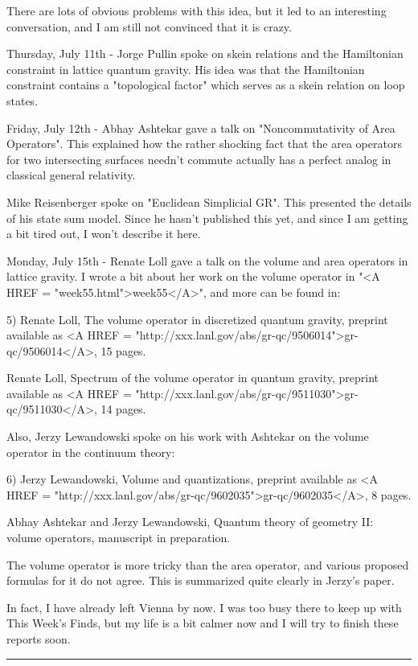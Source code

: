 There are lots of obvious problems with this idea, but it led to an
interesting conversation, and I am still not convinced that it is
crazy.  

Thursday, July 11th - Jorge Pullin spoke on skein relations and
the Hamiltonian constraint in lattice quantum gravity.  His idea
was that the Hamiltonian constraint contains a "topological factor"
which serves as a skein relation on loop states.  

Friday, July 12th - Abhay Ashtekar gave a talk on "Noncommutativity
of Area Operators".  This explained how the rather shocking fact that
the area operators for two intersecting surfaces needn't commute actually 
has a perfect analog in classical general relativity.  

Mike Reisenberger spoke on "Euclidean Simplicial GR".  This presented
the details of his state sum model.  Since he hasn't published this
yet, and since I am getting a bit tired out, I won't describe it here.

Monday, July 15th - Renate Loll gave a talk on the volume and area
operators in lattice gravity.  I wrote a bit about her work on the
volume operator in "<A HREF = "week55.html">week55</A>", and more can be found in:
  
5) Renate Loll, The volume operator in discretized quantum gravity,
preprint available as <A HREF = "http://xxx.lanl.gov/abs/gr-qc/9506014">gr-qc/9506014</A>, 15 pages.  

Renate Loll, Spectrum of the volume operator in quantum gravity, 
preprint available as <A HREF = "http://xxx.lanl.gov/abs/gr-qc/9511030">gr-qc/9511030</A>, 14 pages. 

Also, Jerzy Lewandowski spoke on his work with Ashtekar on
the volume operator in the continuum theory:

6) Jerzy Lewandowski, Volume and quantizations, preprint available
as <A HREF = "http://xxx.lanl.gov/abs/gr-qc/9602035">gr-qc/9602035</A>, 8 pages.  

Abhay Ashtekar and Jerzy Lewandowski, Quantum theory of geometry II: 
volume operators, manuscript in preparation.

The volume operator is more tricky than the area operator, and various
proposed formulas for it do not agree.  This is summarized quite
clearly in Jerzy's paper.

In fact, I have already left Vienna by now.  I was too busy there
to keep up with This Week's Finds, but my life is a bit calmer now
and I will try to finish these reports soon.


\par\noindent\rule{\textwidth}{0.4pt}

